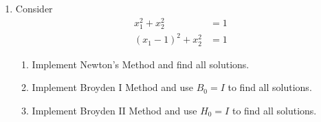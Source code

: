\documentclass[12pt]{amsart}
\numberwithin{equation}{section}
\numberwithin{table}{section}
\numberwithin{figure}{section}
\numberwithin{algorithm}{section}
\begin{document}
\begin{enumerate}
\

\item Consider
\vskip -20pt
\begin{align*}
x_{1}^{2} + x_{2}^{2} &= 1 \\
(x_{1}-1)^{2} + x_{2}^{2} & =1 
\end{align*}
\begin{enumerate}
\item Implement Newton's Method and find all solutions. 
\item Implement Broyden I Method and use $B_{0} = I$ to find all solutions.
\item Implement Broyden II Method and use $H_{0} = I$ to find all solutions.
\end{enumerate}

\end{enumerate}
\end{document}
